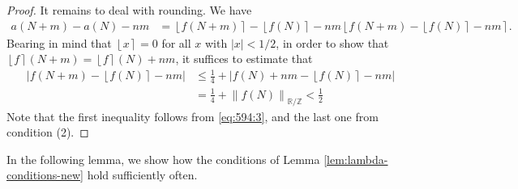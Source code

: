 \documentclass{amsart}
\theoremstyle{definition}
\newcommand{\nint}[1]{\left\lfloor #1 \right\rceil}
\newcommand{\fpa}[1]{\left\lVert #1 \right\rVert_{\RR/\ZZ}}
\newcommand{\abs}[1]{\left|#1\right|}
\newcommand{\ZZ}{\mathbb{Z}}
\newcommand{\RR}{\mathbb{R}}
\begin{document}
\begin{proof}
It remains to deal with rounding. We have
\begin{align*}
	 a(N+m)\!-\!a(N)\!-\!nm &= \nint{f(N+m)}\!-\!\nint{f(N)}\!-\!nm 
	 \nint{f(N+m)\!-\!\nint{f(N)}\!-\!nm }.
\end{align*}
Bearing in mind that $\nint{x} = 0$ for all $x$ with $\abs{x} < 1/2$, in order to show that $\nint{f}(N+m) = \nint{f}(N) + nm$, it suffices to estimate that
\begin{align*}
\abs{ f(N+m) - \nint{f(N)} - nm  } &\leq \frac{1}{4} + \abs{ f(N) +  nm - \nint{f(N)} - nm} 
\\ &= \frac{1}{4} + \fpa{f(N)} < \frac{1}{2}
\end{align*}
Note that the first inequality follows from \eqref{eq:594:3}, and the last one from condition (2).

\end{proof}

In the following lemma, we show how the conditions of Lemma \ref{lem:lambda-conditions-new} hold sufficiently often.
\end{document}
